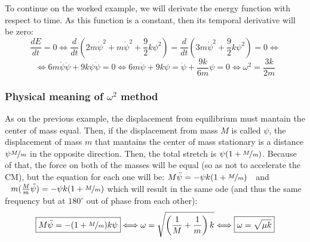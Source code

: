\documentclass{report}
\begin{document}
  \noindent To continue on the worked example, we will derivate the energy function with respect to time. As this function is a constant, then its temporal derivative will be zero:
  \[\dfrac{dE}{dt}=0\Longleftrightarrow \dfrac{d}{dt}\left(2m\dot{\psi}^2+m\dot{\psi}^2+\dfrac92 k\psi^2\right)=\dfrac{d}{dt}\left(3m\dot{\psi}^2+\dfrac92 k\psi^2\right)=0\Longleftrightarrow\]
  \[\Longleftrightarrow 6m\dot{\psi}\ddot{\psi}+9k\psi\dot{\psi}=0\Longleftrightarrow 6m\ddot{\psi}+9k\psi = \ddot{\psi}+\dfrac{9k}{6m}\psi=0\Longleftrightarrow \boxed{\omega^2=\dfrac{3k}{2m}}\]
\subsubsection*{Physical meaning of $\omega^2$ method}
  \noindent As on the previous example, the displacement from equilibrium must mantain the center of mass equal. Then, if the displacement from mass $M$ is called $\psi$, the displacement of mass $m$ that mantains the center of mass stationary is a distance $\psi\nicefrac{M}{m}$ in the opposite direction. Then, the total stretch is $\psi(1+\nicefrac{M}{m})$.
  \noindent Because of that, the force on both of the masses will be equal (so as not to accelerate the CM), but the equation for each one will be: $M\ddot{\psi}=-\psi k(1+\nicefrac{M}{m})\ \ $ and $\ \ m(\frac{M}{m}\ddot{\psi})=-\psi k(1+\nicefrac{M}{m})$ which will result in the same ode (and thus the same frequency but at $180^\circ$ out of phase from each other): 
  \[\boxed{M\ddot{\psi}=-(1+\nicefrac{M}{m})k\psi} \Longleftrightarrow \omega=\sqrt{\left(\dfrac{1}{M}+\dfrac{1}{m}\right)k}\Longleftrightarrow\boxed{\omega=\sqrt{\mu k}}\]
\end{document}

